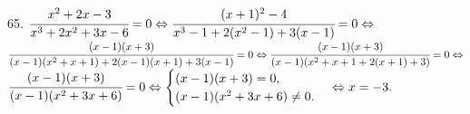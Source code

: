65. $\cfrac{x^2+2x-3}{x^3+2x^2+3x-6}=0\Leftrightarrow\cfrac{(x+1)^2-4}{x^3-1+2(x^2-1)+3(x-1)}=0\Leftrightarrow$\\$
\cfrac{(x-1)(x+3)}{(x-1)(x^2+x+1)+2(x-1)(x+1)+3(x-1)}=0\Leftrightarrow
\cfrac{(x-1)(x+3)}{(x-1)(x^2+x+1+2(x+1)+3)}=0\Leftrightarrow$\\$
\cfrac{(x-1)(x+3)}{(x-1)(x^2+3x+6)}=0\Leftrightarrow \begin{cases} (x-1)(x+3)=0,\\ (x-1)(x^2+3x+6)\neq0.\end{cases}
\Leftrightarrow x=-3.$\\
